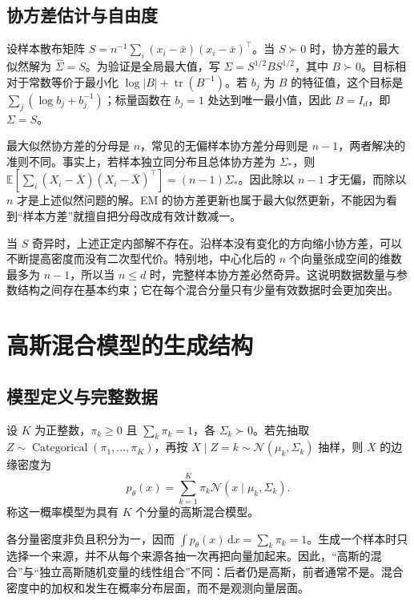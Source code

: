 \documentclass[UTF8]{ctexart}
\begin{document}
\subsection{协方差估计与自由度}
设样本散布矩阵 $S=n^{-1}\sum_i(x_i-\bar x)(x_i-\bar x)^\top$。当 $S\succ0$ 时，协方差的最大似然解为 $\widehat\Sigma=S$。为验证是全局最大值，写 $\Sigma=S^{1/2}BS^{1/2}$，其中 $B\succ0$。目标相对于常数等价于最小化 $\log|B|+\operatorname{tr}(B^{-1})$。若 $b_j$ 为 $B$ 的特征值，这个目标是 $\sum_j(\log b_j+b_j^{-1})$；标量函数在 $b_j=1$ 处达到唯一最小值，因此 $B=I_d$，即 $\Sigma=S$。

最大似然协方差的分母是 $n$，常见的无偏样本协方差分母则是 $n-1$，两者解决的准则不同。事实上，若样本独立同分布且总体协方差为 $\Sigma_*$，则 $\mathbb E[\sum_i(X_i-\bar X)(X_i-\bar X)^\top]=(n-1)\Sigma_*$。因此除以 $n-1$ 才无偏，而除以 $n$ 才是上述似然问题的解。EM 的协方差更新也属于最大似然更新，不能因为看到“样本方差”就擅自把分母改成有效计数减一。

当 $S$ 奇异时，上述正定内部解不存在。沿样本没有变化的方向缩小协方差，可以不断提高密度而没有二次型代价。特别地，中心化后的 $n$ 个向量张成空间的维数最多为 $n-1$，所以当 $n\leq d$ 时，完整样本协方差必然奇异。这说明数据数量与参数结构之间存在基本约束；它在每个混合分量只有少量有效数据时会更加突出。

\section{高斯混合模型的生成结构}
\label{sec:gmm-model}

\subsection{模型定义与完整数据}
\begin{definition}[有限高斯混合模型]
设 $K$ 为正整数，$\pi_k\geq0$ 且 $\sum_k\pi_k=1$，各 $\Sigma_k\succ0$。若先抽取 $Z\sim\operatorname{Categorical}(\pi_1,\ldots,\pi_K)$，再按 $X\mid Z=k\sim\mathcal N(\mu_k,\Sigma_k)$ 抽样，则 $X$ 的边缘密度为
\begin{equation}
p_\theta(x)=\sum_{k=1}^K\pi_k\mathcal N(x\mid\mu_k,\Sigma_k).
\label{eq:gmm-mixture-density}
\end{equation}
称这一概率模型为具有 $K$ 个分量的高斯混合模型。
\end{definition}

各分量密度非负且积分为一，因而 $\int p_\theta(x)\,\mathrm dx=\sum_k\pi_k=1$。生成一个样本时只选择一个来源，并不从每个来源各抽一次再把向量加起来。因此，“高斯的混合”与“独立高斯随机变量的线性组合”不同：后者仍是高斯，前者通常不是。混合密度中的加权和发生在概率分布层面，而不是观测向量层面。
\end{document}
